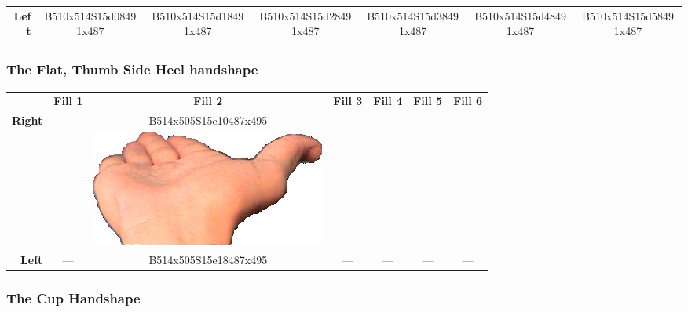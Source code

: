 \documentclass{article}
\begin{document}
\begin{center}
\begin{tabular}{r*{6}{c}}
\textbf{Left}&
B510x514S15d08491x487&
B510x514S15d18491x487&
B510x514S15d28491x487&
B510x514S15d38491x487&
B510x514S15d48491x487&
B510x514S15d58491x487\\
\end{tabular}
\end{center}

\subsubsection{The Flat, Thumb Side Heel handshape}

\begin{center}
\begin{tabular}{r*{6}{c}}
&\textbf{Fill 1}&\textbf{Fill 2}&\textbf{Fill 3}&\textbf{Fill 4}&\textbf{Fill 5}&\textbf{Fill 6}\\
\multirow{2}{*}{\textbf{Right}}&
\multirow{2}{*}{---}&
B514x505S15e10487x495&
\multirow{2}{*}{---}&
\multirow{2}{*}{---}&
\multirow{2}{*}{---}&
\multirow{2}{*}{---}\\
&
&
\includegraphics[scale=0.1]{images/05-13-2.jpg}\\
\textbf{Left}&
---&
B514x505S15e18487x495&
---&
---&
---&
---\\
\end{tabular}
\end{center}

\subsubsection{The Cup Handshape}
\end{document}
